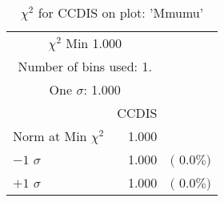  \begin{table}[h!]\centering
 {\small{
 \begin{tabular}{||l||r||r||}
 \hline
 \hline
\multicolumn{2}{||c||}{$\chi^{2}$ Min   1.000} & \\
 \multicolumn{2}{||c||}{Number of bins used:   1.} & \\
\multicolumn{2}{||c||}{One $\sigma$:    1.000} & \\
 \hline
 \hline
    & CCDIS & \\
Norm at Min $\chi^{2}$  &   1.000 & \\
$-1$ $\sigma$ &   1.000  &  $($  0.0$\%)$  \\
$+1$ $\sigma$ &   1.000  &  $($  0.0$\%)$  \\
 \hline
 \hline
 \end{tabular}
 \caption{$\chi^{2}$ for CCDIS on plot: 'Mmumu'}
 \label{tab-chiccdis}
 }}
 \end{table}
 \endinput
